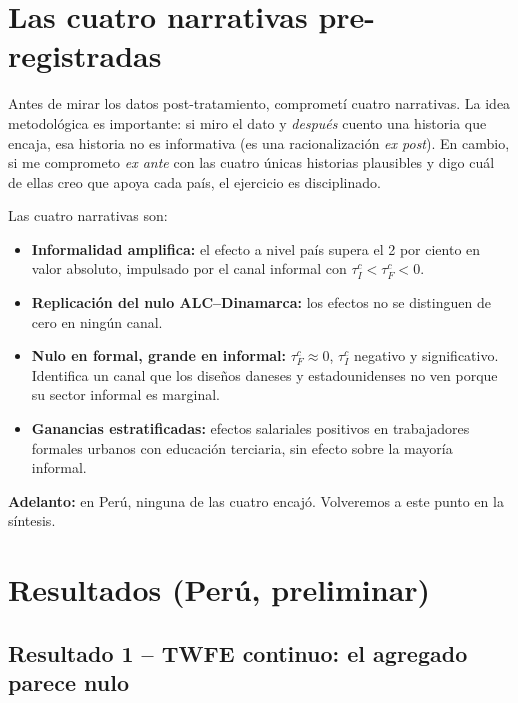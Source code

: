\documentclass[12pt]{article}
\begin{document}
\section{Las cuatro narrativas pre-registradas}

Antes de mirar los datos post-tratamiento, comprometí cuatro narrativas. La idea metodológica es importante: si miro el dato y \emph{después} cuento una historia que encaja, esa historia no es informativa (es una racionalización \emph{ex post}). En cambio, si me comprometo \emph{ex ante} con las cuatro únicas historias plausibles y digo cuál de ellas creo que apoya cada país, el ejercicio es disciplinado.

Las cuatro narrativas son:

\begin{itemize}
  \item[\textbf{A.}] \textbf{Informalidad amplifica:} el efecto a nivel país supera el 2 por ciento en valor absoluto, impulsado por el canal informal con $\tau_I^c < \tau_F^c < 0$.
  \item[\textbf{B.}] \textbf{Replicación del nulo ALC--Dinamarca:} los efectos no se distinguen de cero en ningún canal.
  \item[\textbf{C.}] \textbf{Nulo en formal, grande en informal:} $\tau_F^c \approx 0$, $\tau_I^c$ negativo y significativo. Identifica un canal que los diseños daneses y estadounidenses no ven porque su sector informal es marginal.
  \item[\textbf{D.}] \textbf{Ganancias estratificadas:} efectos salariales positivos en trabajadores formales urbanos con educación terciaria, sin efecto sobre la mayoría informal.
\end{itemize}

\textbf{Adelanto:} en Perú, ninguna de las cuatro encajó. Volveremos a este punto en la síntesis.

\section{Resultados (Perú, preliminar)}

\subsection{Resultado 1 -- TWFE continuo: el agregado parece nulo}
\end{document}
